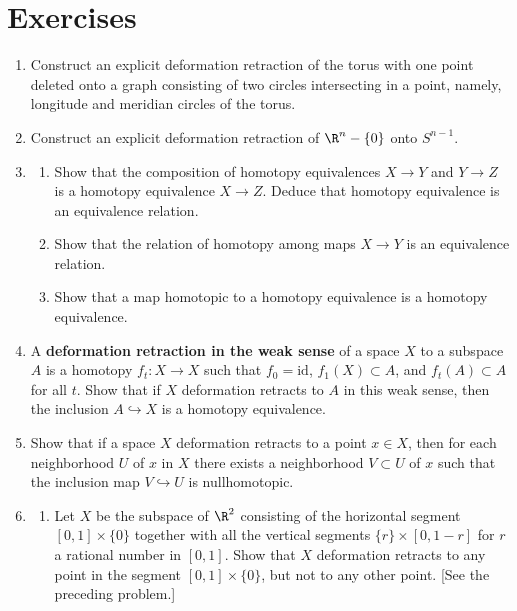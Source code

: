\section*{Exercises}

\begin{enumerate}

\item Construct an explicit deformation retraction of the torus with one point deleted
onto a graph consisting of two circles intersecting in a point, namely, longitude and
meridian circles of the torus.

\item Construct an explicit deformation retraction of $\R^n - \{0\}$ onto $S^{n-1}$.

\item
\begin{enumerate}
\item[(a)] Show that the composition of homotopy equivalences $X \to Y$ and
$Y \to Z$ is a homotopy equivalence $X \to Z$. Deduce that homotopy equivalence is
an equivalence relation.
\item[(b)] Show that the relation of homotopy among maps $X \to Y$ is an
equivalence relation.
\item[(c)] Show that a map homotopic to a homotopy equivalence is a homotopy
equivalence.
\end{enumerate}

\item A \textbf{deformation retraction in the weak sense} of a space $X$ to a subspace
$A$ is a homotopy $f_t : X \to X$ such that $f_0 = \mathrm{id}$, $f_1(X) \subset A$, and
$f_t(A) \subset A$ for all $t$. Show that if $X$ deformation retracts to $A$ in this weak
sense, then the inclusion $A \hookrightarrow X$ is a homotopy equivalence.

\item Show that if a space $X$ deformation retracts to a point $x \in X$, then for each
neighborhood $U$ of $x$ in $X$ there exists a neighborhood $V \subset U$ of $x$ such
that the inclusion map $V \hookrightarrow U$ is nullhomotopic.

\item
\begin{enumerate}
\item[(a)] Let $X$ be the subspace of $\R^2$ consisting of the horizontal segment
$[0,1] \times \{0\}$ together with all the vertical segments $\{r\} \times [0,1-r]$ for $r$ a
rational number in $[0,1]$. Show that $X$ deformation retracts to any point in the
segment $[0,1] \times \{0\}$, but not to any other point. [See the preceding problem.]




\end{enumerate}
\end{enumerate}
